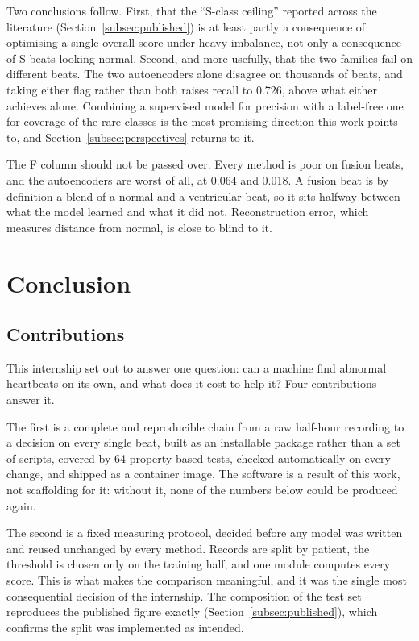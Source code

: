 \documentclass[a4paper, 12pt]{article}
\begin{document}
Two conclusions follow. First, that the ``S-class ceiling'' reported across the
literature (Section~\ref{subsec:published}) is at least partly a consequence of
optimising a single overall score under heavy imbalance, not only a consequence of
S beats looking normal. Second, and more usefully, that the two families fail on
different beats. The two autoencoders alone disagree on thousands of beats, and
taking either flag rather than both raises recall to \num{0.726}, above what either
achieves alone. Combining a supervised model for precision with a label-free one
for coverage of the rare classes is the most promising direction this work points
to, and Section~\ref{subsec:perspectives} returns to it.

The F column should not be passed over. Every method is poor on fusion beats, and
the autoencoders are worst of all, at \num{0.064} and \num{0.018}. A fusion beat is
by definition a blend of a normal and a ventricular beat, so it sits halfway
between what the model learned and what it did not. Reconstruction error, which
measures distance from normal, is close to blind to it.



\section{Conclusion} \label{sec:conclusion}

\subsection{Contributions} \label{subsec:contributions}

This internship set out to answer one question: can a machine find abnormal
heartbeats on its own, and what does it cost to help it? Four contributions answer
it.

The first is a complete and reproducible chain from a raw half-hour recording to a
decision on every single beat, built as an installable package rather than a set of
scripts, covered by 64 property-based tests, checked automatically on every change,
and shipped as a container image. The software is a result of this work, not
scaffolding for it: without it, none of the numbers below could be produced again.

The second is a fixed measuring protocol, decided before any model was written and
reused unchanged by every method. Records are split by patient, the threshold is
chosen only on the training half, and one module computes every score. This is what
makes the comparison meaningful, and it was the single most consequential decision
of the internship. The composition of the test set reproduces the published figure
exactly (Section~\ref{subsec:published}), which confirms the split was implemented
as intended.
\end{document}
